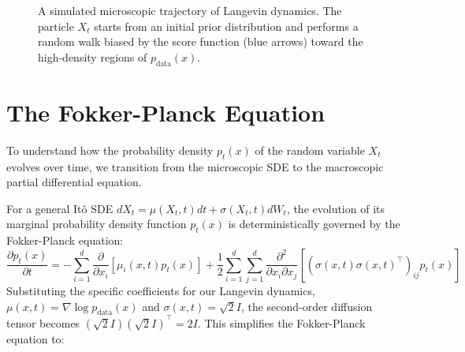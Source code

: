 \begin{figure}[htpb]
\centering
{}
\caption{A simulated microscopic trajectory of Langevin dynamics. The particle $X_t$ starts from an initial prior distribution and performs a random walk biased by the score function (blue arrows) toward the high-density regions of $p_{\text{data}}(x)$.}
\label{fig:langevin_trajectory}
\end{figure}


\section{The Fokker-Planck Equation}

To understand how the probability density $p_t(x)$ of the random variable $X_t$ evolves over time, we transition from the microscopic SDE to the macroscopic partial differential equation. 

For a general It\^o SDE $dX_t = \mu(X_t, t) dt + \sigma(X_t, t) dW_t$, the evolution of its marginal probability density function $p_t(x)$ is deterministically governed by the Fokker-Planck equation:
\begin{equation}
    \frac{\partial p_t(x)}{\partial t} = -\sum_{i=1}^d \frac{\partial}{\partial x_i} \left[ \mu_i(x, t) p_t(x) \right] + \frac{1}{2} \sum_{i=1}^d \sum_{j=1}^d \frac{\partial^2}{\partial x_i \partial x_j} \left[ (\sigma(x,t) \sigma(x,t)^\top)_{ij} p_t(x) \right]
\end{equation}
Substituting the specific coefficients for our Langevin dynamics, $\mu(x, t) = \nabla \log p_{\text{data}}(x)$ and $\sigma(x, t) = \sqrt{2} I$, the second-order diffusion tensor becomes $(\sqrt{2} I)(\sqrt{2} I)^\top = 2I$. This simplifies the Fokker-Planck equation to:

